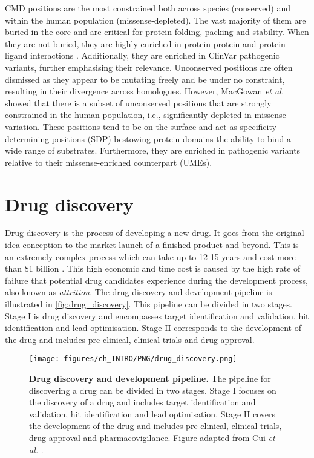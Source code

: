 CMD positions are the most constrained both across species (conserved) and within the human population (missense-depleted). The vast majority of them are buried in the core and are critical for protein folding, packing and stability. When they are not buried, they are highly enriched in protein-protein and protein-ligand interactions \cite{UTGES_2021_ANKS}. Additionally, they are enriched in ClinVar \cite{LANDRUM_2013_CLINVAR} pathogenic variants, further emphasising their relevance. Unconserved positions are often dismissed as they appear to be mutating freely and be under no constraint, resulting in their divergence across homologues. However, MacGowan \textit{et al.} \cite{MACGOWAN_2024_VARIANTS} showed that there is a subset of unconserved positions that are strongly constrained in the human population, i.e., significantly depleted in missense variation. These positions tend to be on the surface and act as specificity-determining positions (SDP) bestowing protein domains the ability to bind a wide range of substrates. Furthermore, they are enriched in pathogenic variants relative to their missense-enriched counterpart (UMEs).


\section{Drug discovery}

Drug discovery is the process of developing a new drug. It goes from the original idea conception to the market launch of a finished product and beyond. This is an extremely complex process which can take up to 12-15 years and cost more than \$1 billion \cite{HUGHES_2011_DRUGS}. This high economic and time cost is caused by the high rate of failure that potential drug candidates experience during the development process, also known as \textit{attrition}. The drug discovery and development pipeline is illustrated in \autoref{fig:drug_discovery}. This pipeline can be divided in two stages. Stage I is drug discovery and encompasses target identification and validation, hit identification and lead optimisation. Stage II corresponds to the development of the drug and includes pre-clinical, clinical trials and drug approval.

\begin{figure}[htb!]
    \centering
    \texttt{[image: figures/ch\_INTRO/PNG/drug\_discovery.png]}
    \caption[Drug discovery and development pipeline]{\textbf{Drug discovery and development pipeline.} The pipeline for discovering a drug can be divided in two stages. Stage I focuses on the discovery of a drug and includes target identification and validation, hit identification and lead optimisation. Stage II covers the development of the drug and includes pre-clinical, clinical trials, drug approval and pharmacovigilance. Figure adapted from Cui \textit{et al.} \cite{CUI_2020_DRUGS}.}
    \label{fig:drug_discovery}
\end{figure}

